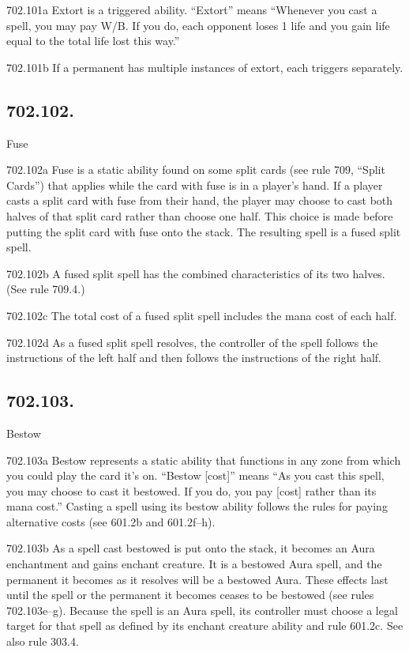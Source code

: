 702.101a Extort is a triggered ability. “Extort” means “Whenever you cast a spell, you may pay {W/B}. If you do, each opponent loses 1 life and you gain life equal to the total life lost this way.”

702.101b If a permanent has multiple instances of extort, each triggers separately.

\subsection*{702.102.}
Fuse

702.102a Fuse is a static ability found on some split cards (see rule 709, “Split Cards”) that applies while the card with fuse is in a player’s hand. If a player casts a split card with fuse from their hand, the player may choose to cast both halves of that split card rather than choose one half. This choice is made before putting the split card with fuse onto the stack. The resulting spell is a fused split spell.

702.102b A fused split spell has the combined characteristics of its two halves. (See rule 709.4.)

702.102c The total cost of a fused split spell includes the mana cost of each half.

702.102d As a fused split spell resolves, the controller of the spell follows the instructions of the left half and then follows the instructions of the right half.

\subsection*{702.103.}
Bestow

702.103a Bestow represents a static ability that functions in any zone from which you could play the card it’s on. “Bestow [cost]” means “As you cast this spell, you may choose to cast it bestowed. If you do, you pay [cost] rather than its mana cost.” Casting a spell using its bestow ability follows the rules for paying alternative costs (see 601.2b and 601.2f–h).

702.103b As a spell cast bestowed is put onto the stack, it becomes an Aura enchantment and gains enchant creature. It is a bestowed Aura spell, and the permanent it becomes as it resolves will be a bestowed Aura. These effects last until the spell or the permanent it becomes ceases to be bestowed (see rules 702.103e–g). Because the spell is an Aura spell, its controller must choose a legal target for that spell as defined by its enchant creature ability and rule 601.2c. See also rule 303.4.

